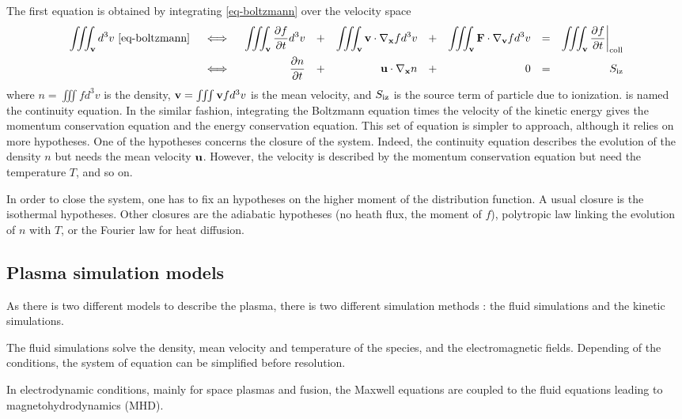 The first equation is obtained by integrating \cref{eq-boltzmann} over the velocity space
\begin{align}
  \iiint_{\vect{v}} d^3v \text{ \cref{eq-boltzmann}} &&{ } \iff { }&& \iiint_{\vect{v}}  \deriv{f}{t} d^3v &&+&& \iiint_{\vect{v}}  \vect{v} \cdot \grad_{\vect{x}} f  d^3v &&+&&  \iiint_{\vect{v}}  \vect{F} \cdot  \grad_{\vect{v}} f  d^3v && = && \iiint_{\vect{v}}  \deriv{f}{t} \bigg\vert_{\rm coll} \nonumber  \\ 
  && { } \iff { }&&  \deriv{n}{t} &&+&& \vect{u}  \cdot \grad_{\vect{x}} n &&+&& 0 &&=&& S_{\rm iz}   \label{eq-conc}
\end{align} 
where $n=\iiint f d^3v$ is the density, ${\mathbf v} = \iiint {\mathbf v} f d^3v$ is the mean velocity, and $S_{\rm iz}$ is the source term of particle due to ionization.
 is named the continuity equation.
In the similar fashion, integrating the Boltzmann equation times the velocity of the kinetic energy gives the momentum conservation equation and the energy conservation equation.
This set of equation is simpler to approach, although it relies on more hypotheses.
One of the hypotheses concerns the closure of the system.
Indeed, the continuity equation describes the evolution of the density $n$ but needs the mean velocity ${\mathbf u}$.
However, the velocity is described by the momentum conservation equation but need the temperature $T$, and so on.

In order to close the system, one has to fix an hypotheses on the higher moment of the distribution function.
A usual closure is the isothermal hypotheses. 
Other closures are the adiabatic hypotheses (no heath flux, the  moment of $f$), polytropic law linking the evolution of $n$ with $T$, or the Fourier law for heat diffusion.

\subsection*{Plasma simulation models} \label{subsec-simulations}
As there is two different models to describe the plasma, there is two different simulation methods : the fluid simulations and the kinetic simulations.

The fluid simulations solve the density, mean velocity and temperature of the species, and the electromagnetic fields.
Depending of the conditions, the system of equation can be simplified before resolution.

In electrodynamic conditions, mainly for space plasmas and fusion, the Maxwell equations are coupled to the fluid equations leading to magnetohydrodynamics (MHD).

